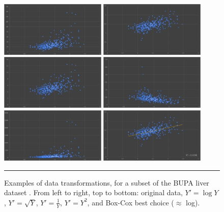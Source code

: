 \begin{figure}[t]
\centering
\includegraphics[width=0.45\textwidth]{images/DP/original_BUPA.png}
\quad
\includegraphics[width=0.45\textwidth]{images/DP/log.png} \\
\includegraphics[width=0.45\textwidth]{images/DP/sqrt.png} 
\quad
\includegraphics[width=0.45\textwidth]{images/DP/inverse.png} \\
\includegraphics[width=0.45\textwidth]{images/DP/square.png} 
\quad
\includegraphics[width=0.45\textwidth]{images/DP/boxcox.png}
\caption[\small Examples of data transformations]{\small Examples of data transformations, for a subset of the BUPA liver dataset \cite{DP_BUPA}. From left to right, top to bottom: original data, $Y'=\log Y$, $Y'=\sqrt{Y}$, $Y'=\frac{1}{Y}$, $Y'=Y^2$, and Box-Cox best choice ($\approx$ log). }
\hrule\label{fig:transforms}
\end{figure}
